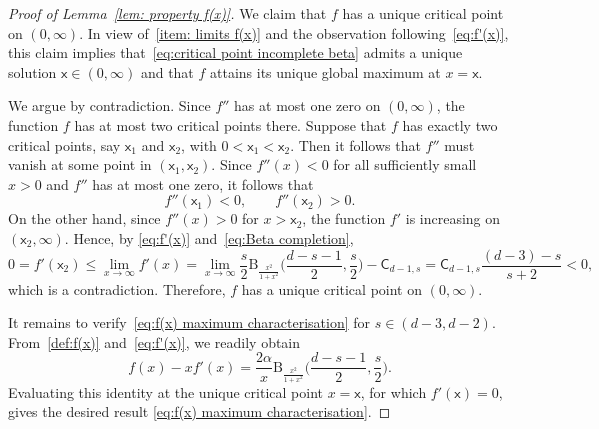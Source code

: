 \documentclass[10pt,a4paper]{amsart}
\begin{document}
\begin{proof}[Proof of Lemma~\ref{lem: property f(x)}]
We claim that $f$ has a unique critical point on $(0,\infty)$. In view
of~\ref{item: limits f(x)} and the observation following~\eqref{eq:f'(x)},
this claim implies that~\eqref{eq:critical point incomplete beta} admits
a unique solution $\mathsf{x}\in(0,\infty)$ and that $f$ attains its
unique global maximum at $x=\mathsf{x}$.

We argue by contradiction. Since $f''$ has at most one zero on
$(0,\infty)$, the function $f$ has at most two critical points there.
Suppose that $f$ has exactly two critical points, say
$\mathsf{x}_1$ and $\mathsf{x}_2$, with $0<\mathsf{x}_1<\mathsf{x}_2$. Then it follows that $f''$ must vanish at
some point in $(\mathsf{x}_1,\mathsf{x}_2)$. Since $f''(x)<0$ for all
sufficiently small $x>0$ and $f''$ has at most one zero, it follows that
\[
    f''(\mathsf{x}_1)<0, \qquad f''(\mathsf{x}_2)>0.
\]
On the other hand, since $f''(x)>0$ for $x>\mathsf{x}_2$, the function
$f'$ is increasing on $(\mathsf{x}_2,\infty)$. Hence, by
\eqref{eq:f'(x)} and~\eqref{eq:Beta completion}, 
\[
    0=f'(\mathsf{x}_2)\le \lim_{x\to\infty}f'(x) = \lim_{x\to\infty}\frac{s}{2}\mathrm{B}_{\frac{x^2}{1+x^2}}\Big(\frac{d-s-1}{2},\frac{s}{2}\Big)-\mathsf{C}_{d-1,s} = \mathsf{C}_{d-1,s}\frac{(d-3)-s}{s+2}<0,
\]
which is a contradiction. Therefore, $f$ has a unique critical point
on $(0,\infty)$.  

It remains to verify~\eqref{eq:f(x) maximum characterisation} for
$s\in(d-3,d-2)$. From~\eqref{def:f(x)} and~\eqref{eq:f'(x)}, we readily obtain 
\begin{equation}
    f(x)-xf'(x)= \frac{2\alpha}{x}\mathrm{B}_{\frac{x^2}{1+x^2}}\Big(\frac{d-s-1}{2},\frac{s}{2}\Big).
\end{equation}
Evaluating this identity at the unique critical point $x=\mathsf{x}$,
for which $f'(\mathsf{x})=0$, gives the desired result \eqref{eq:f(x) maximum characterisation}. 
\end{proof}
\end{document}

